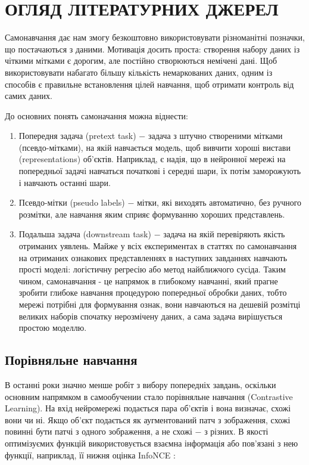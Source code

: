 \section{ОГЛЯД ЛІТЕРАТУРНИХ ДЖЕРЕЛ}
\label{sec:Theory}

Самонавчання дає нам змогу безкоштовно використовувати різноманітні позначки, що постачаються з даними. Мотивація досить проста: створення набору даних із чіткими мітками є дорогим, але постійно створюються немічені дані. Щоб використовувати набагато більшу кількість немаркованих даних, одним із способів є правильне встановлення цілей навчання, щоб отримати контроль від самих даних.

До основних понять самоначання можна віднести:

\begin{enumerate}
	\item Попередня задача (pretext task) $-$ задача з штучно створеними мітками (псевдо-мітками), на якій навчається модель, щоб вивчити хороші вистави (representations) об'єктів. Наприклад, є надія, що в нейронної мережі на попередньої задачі навчаться початкові і середні шари, їх потім заморожують і навчають останні шари.
	\item Псевдо-мітки (pseudo labels) $-$ мітки, які виходять автоматично, без ручного розмітки, але навчання яким сприяє формуванню хороших представлень.
	\item Подальша задача (downstream task) $-$ задача на якій перевіряють якість отриманих уявлень. Майже у всіх експериментах в статтях по самонавчання на отриманих ознакових представленнях в наступних завданнях навчають прості моделі: логістичну регресію або метод найближчого сусіда. Таким чином, самонавчання - це напрямок в глибокому навчанні, який прагне зробити глибоке навчання процедурою попередньої обробки даних, тобто мережі потрібні для формування ознак, вони навчаються на дешевій розмітці великих наборів спочатку нерозмічену даних, а сама задача вирішується простою моделлю.
\end{enumerate}

\subsection{Порівняльне навчання}

В останні роки значно менше робіт з вибору попередніх завдань, оскільки основним напрямком в самообучении стало порівняльне навчання (Contrastive Learning). На вхід нейромережі подається пара об'єктів і вона визначає, схожі вони чи ні. Якщо об'єкт подається як аугментований патч з зображення, схожі повинні бути патчі з одного зображення, а не схожі $-$ з різних. В якості оптимізуємих функцій використовується взаємна інформація або пов'язані з нею функції, наприклад, її нижня оцінка InfoNCE :

